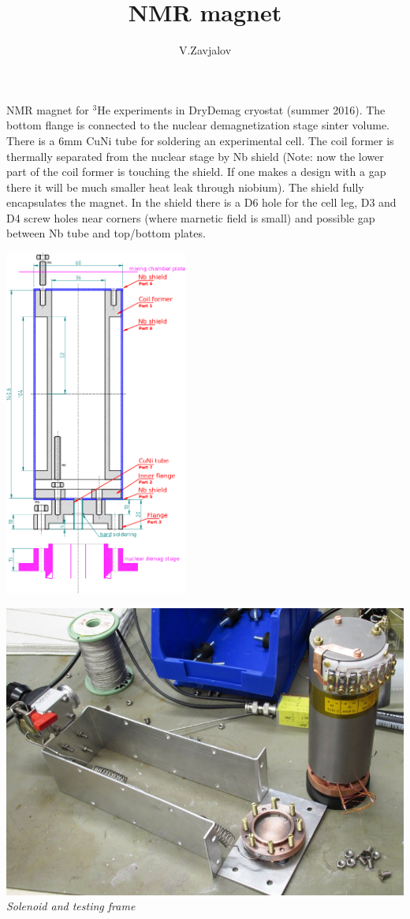 \documentclass[a4paper]{article}
\title{NMR magnet}
\author{V.Zavjalov}
\begin{document}
\maketitle

NMR magnet for $^3$He experiments in DryDemag cryostat (summer 2016). The bottom flange
is connected to the nuclear demagnetization stage sinter volume. There is
a 6mm CuNi tube for soldering an experimental cell. The coil former is
thermally separated from the nuclear stage by Nb shield (Note: now the
lower part of the coil former is touching the shield. If one makes a
design with a gap there it will be much smaller heat leak through
niobium). The shield fully encapsulates the magnet. In the shield there
is a D6 hole for the cell leg, D3 and D4 screw holes near corners (where
marnetic field is small) and possible gap between Nb tube and top/bottom
plates.

\begin{center}
\includegraphics[width=6cm]{img/solenoid_plan.png}
\end{center}

\vbox{\noindent
\includegraphics[width=\linewidth]{img/solenoid.jpg}\\
\it Solenoid and testing frame
}
\end{document}
